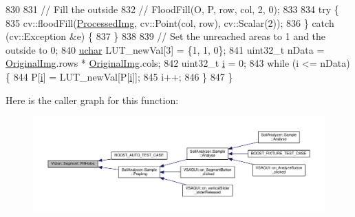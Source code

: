\begin{DoxyCode}
830 
831   \textcolor{comment}{// Fill the outside}
832   \textcolor{comment}{// FloodFill(O, P, row, col, 2, 0);}
833 
834   \textcolor{keywordflow}{try} \{
835     cv::floodFill(\hyperlink{class_vision_1_1_image_processing_aa7d65742882cd1b2a1e4e9cb68809211}{ProcessedImg}, cv::Point(col, row), cv::Scalar(2));
836   \} \textcolor{keywordflow}{catch} (cv::Exception &e) \{
837   \}
838 
839   \textcolor{comment}{// Set the unreached areas to 1 and the outside to 0;}
840   \hyperlink{_soil_math_types_8h_a65f85814a8290f9797005d3b28e7e5fc}{uchar} LUT\_newVal[3] = \{1, 1, 0\};
841   uint32\_t nData = \hyperlink{class_vision_1_1_image_processing_a77c370dab270158a4e9c634e2d3f48e7}{OriginalImg}.rows * \hyperlink{class_vision_1_1_image_processing_a77c370dab270158a4e9c634e2d3f48e7}{OriginalImg}.cols;
842   uint32\_t \hyperlink{_comparision_pictures_2_createtest_image_8m_a6f6ccfcf58b31cb6412107d9d5281426}{i} = 0;
843   \textcolor{keywordflow}{while} (i <= nData) \{
844     P[\hyperlink{_comparision_pictures_2_createtest_image_8m_a6f6ccfcf58b31cb6412107d9d5281426}{i}] = LUT\_newVal[P[\hyperlink{_comparision_pictures_2_createtest_image_8m_a6f6ccfcf58b31cb6412107d9d5281426}{i}]];
845     i++;
846   \}
847 \}
\end{DoxyCode}


Here is the caller graph for this function\+:\nopagebreak
\begin{figure}[H]
\begin{center}
\leavevmode
\includegraphics[width=350pt]{class_vision_1_1_segment_a9b1476507a27dbef21acca64efd217b8_icgraph}
\end{center}
\end{figure}


\hypertarget{class_vision_1_1_segment_a62e29f1cc5db86f670c488966a06d644}{}
